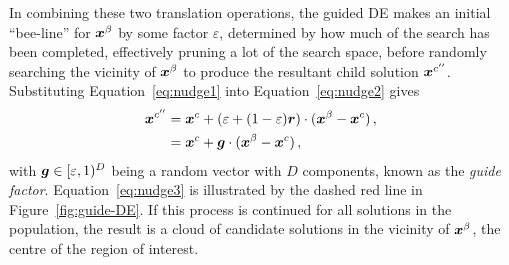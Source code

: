 In combining these two translation operations, the guided DE makes an initial ``bee-line'' for $\boldsymbol{x}^\beta$ by some factor $\varepsilon$, determined by how much of the search has been completed, effectively pruning a lot of the search space, before randomly searching the vicinity of $\boldsymbol{x}^\beta$ to produce the resultant child solution $\boldsymbol{x}^{c''}$. Substituting Equation~\ref{eq:nudge1} into Equation~\ref{eq:nudge2} gives
\begin{align}\label{eq:nudge3}
\boldsymbol{x}^{c''} &= \boldsymbol{x}^{c} + (\varepsilon + (1-\varepsilon)\boldsymbol{r}) \cdot (\boldsymbol{x}^\beta - \boldsymbol{x}^{c})\,,\nonumber\\
& = \boldsymbol{x}^{c} + \boldsymbol{g} \cdot (\boldsymbol{x}^\beta - \boldsymbol{x}^{c})\,,
\end{align}
with $\boldsymbol{g} \in [\varepsilon,1)^D$ being a random vector with $D$ components, known as the \emph{guide factor}. Equation~\ref{eq:nudge3} is illustrated by the dashed red line in Figure~\ref{fig:guide-DE}. If this process is continued for all solutions in the population, the result is a cloud of candidate solutions in the vicinity of $\boldsymbol{x}^\beta$, the centre of the region of interest.

